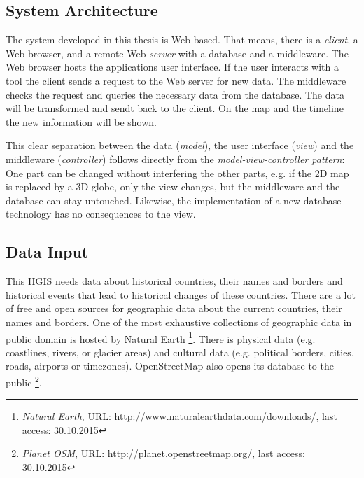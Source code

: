 \subsection{System Architecture} %
\label{sub:system_architecture}

The system developed in this thesis is Web-based. That means, there is a \emph{client}, a Web browser, and a remote Web \emph{server} with a database and a middleware. The Web browser hosts the applications user interface. If the user interacts with a tool the client sends a request to the Web server for new data. The middleware checks the request and queries the necessary data from the database. The data will be transformed and sendt back to the client. On the map and the timeline the new information will be shown.

This clear separation between the data (\emph{model}), the user interface (\emph{view}) and the middleware (\emph{controller}) follows directly from the \emph{model-view-controller pattern}: One part can be changed without interfering the other parts, e.g. if the 2D map is replaced by a 3D globe, only the view changes, but the middleware and the database can stay untouched. Likewise, the implementation of a new database technology has no consequences to the view.



\subsection{Data Input} %
\label{sub:input}

This HGIS needs data about historical countries, their names and borders and historical events that lead to historical changes of these countries. There are a lot of free and open sources for geographic data about the current countries, their names and borders. One of the most exhaustive collections of geographic data in public domain is hosted by Natural Earth
\footnote{
  \textit{Natural Earth},
  URL: \url{http://www.naturalearthdata.com/downloads/},
  last access: 30.10.2015
}.
There is physical data (e.g. coastlines, rivers, or glacier areas) and cultural data (e.g. political borders, cities, roads, airports or timezones). OpenStreetMap also opens its database to the public
\footnote{
  \textit{Planet OSM},
  URL: \url{http://planet.openstreetmap.org/},
  last access: 30.10.2015
}.


